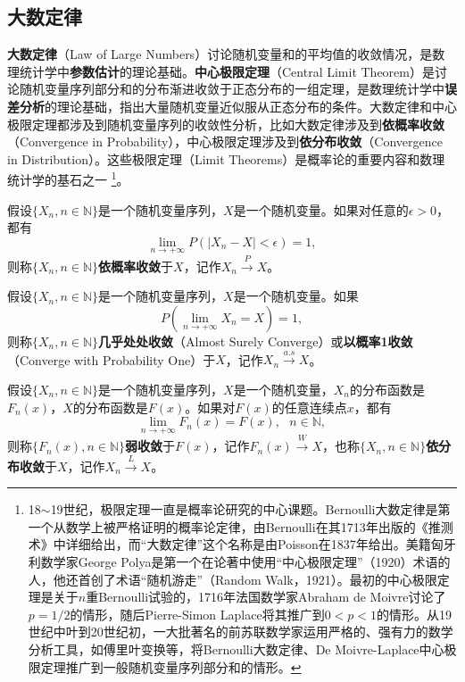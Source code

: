 \subsection{大数定律}
\textbf{大数定律}（Law of Large Numbers）讨论随机变量和的平均值的收敛情况，是数理统计学中\textbf{参数估计}的理论基础。\textbf{中心极限定理}（Central Limit Theorem）是讨论随机变量序列部分和的分布渐进收敛于正态分布的一组定理，是数理统计学中\textbf{误差分析}的理论基础，指出大量随机变量近似服从正态分布的条件。大数定律和中心极限定理都涉及到随机变量序列的收敛性分析，比如大数定律涉及到\textbf{依概率收敛}（Convergence in Probability），中心极限定理涉及到\textbf{依分布收敛}（Convergence in Distribution）。这些极限定理（Limit Theorems）是概率论的重要内容和数理统计学的基石之一
\footnote{18$\sim$19世纪，极限定理一直是概率论研究的中心课题。Bernoulli大数定律是第一个从数学上被严格证明的概率论定律，由Bernoulli在其1713年出版的《推测术》中详细给出，而“大数定律”这个名称是由Poisson在1837年给出。美籍匈牙利数学家George Polya是第一个在论著中使用“中心极限定理”（1920）术语的人，他还首创了术语“随机游走”（Random Walk，1921）。最初的中心极限定理是关于$n$重Bernoulli试验的，1716年法国数学家Abraham de Moivre讨论了$p=1/2$的情形，随后Pierre-Simon Laplace将其推广到$0<p<1$的情形。从19世纪中叶到20世纪初，一大批著名的前苏联数学家运用严格的、强有力的数学分析工具，如傅里叶变换等，将Bernoulli大数定律、De Moivre-Laplace中心极限定理推广到一般随机变量序列部分和的情形。}。

\begin{definition}[依概率收敛]
假设$\{X_n, n\in \mathbb N\}$是一个随机变量序列，$X$是一个随机变量。如果对任意的$\epsilon>0$，都有
\[
    \lim\limits_{n\rightarrow +\infty} P(|X_n-X|<\epsilon) = 1,
\]
则称$\{X_n, n\in \mathbb N\}$\textbf{依概率收敛}于$X$，记作$X_n \stackrel{P}{\longrightarrow} X$。
\end{definition}

\begin{definition}[几乎处处收敛]
假设$\{X_n, n\in \mathbb N\}$是一个随机变量序列，$X$是一个随机变量。如果
\[
    P(\lim\limits_{n\rightarrow +\infty} X_n = X) = 1,
\]
则称$\{X_n, n\in \mathbb N\}$\textbf{几乎处处收敛}（Almost Surely Converge）或\textbf{以概率1收敛}（Converge with Probability One）于$X$，记作$X_n \stackrel{a.s}{\longrightarrow} X$。
\end{definition}

\begin{definition}[依分布收敛]
假设$\{X_n, n\in \mathbb N\}$是一个随机变量序列，$X$是一个随机变量，$X_n$的分布函数是$F_n(x)$，$X$的分布函数是$F(x)$。如果对$F(x)$的任意连续点$x$，都有
\[
    \lim\limits_{n\rightarrow +\infty} F_n(x) = F(x),~~~n\in \mathbb N,
\]
则称$\{F_n(x), n\in \mathbb N\}$\textbf{弱收敛}于$F(x)$，记作$F_n(x) \stackrel{W}{\longrightarrow} X$，也称$\{X_n, n\in \mathbb N\}$\textbf{依分布收敛}于$X$，记作$X_n \stackrel{L}{\longrightarrow} X$。
\end{definition}

